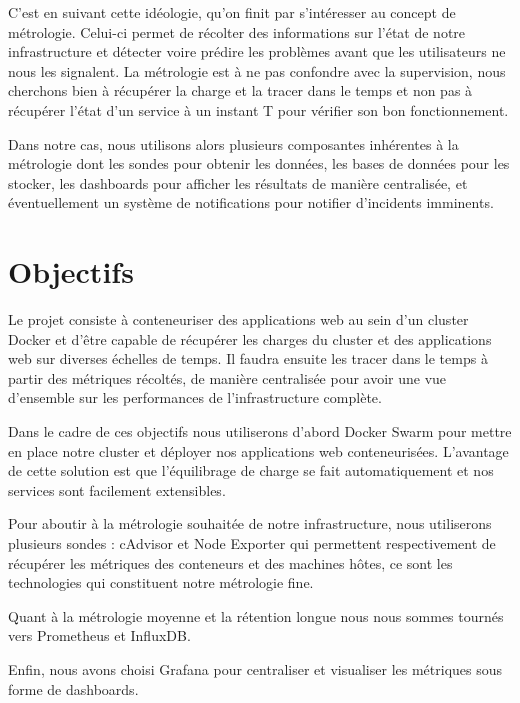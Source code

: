 \documentclass[oneside,12pt]{report}
\begin{document}
C'est en suivant cette idéologie, qu'on finit par s'intéresser au concept de métrologie. Celui-ci permet de récolter des informations sur l'état de notre infrastructure et détecter voire prédire les problèmes avant que les utilisateurs ne nous les signalent. La métrologie est à ne pas confondre avec la supervision, nous cherchons bien à récupérer la charge et la tracer dans le temps et non pas à récupérer l'état d'un service à un instant T pour vérifier son bon fonctionnement. \newline

Dans notre cas, nous utilisons alors plusieurs composantes inhérentes à la métrologie dont les sondes pour obtenir les données, les bases de données pour les stocker, les dashboards pour afficher les résultats de manière centralisée, et éventuellement un système de notifications pour notifier d'incidents imminents.

\section{Objectifs}

Le projet consiste à conteneuriser des applications web au sein d'un cluster Docker et d'être capable de récupérer les charges du cluster et des applications web sur diverses échelles de temps. Il faudra ensuite les tracer dans le temps à partir des métriques récoltés, de manière centralisée pour avoir une vue d'ensemble sur les performances de l'infrastructure complète. \newline


Dans le cadre de ces objectifs nous utiliserons d'abord Docker Swarm pour mettre en place notre cluster et déployer nos applications web conteneurisées. L'avantage de cette solution est que l'équilibrage de charge se fait automatiquement et nos services sont facilement extensibles.\newline


Pour aboutir à la métrologie souhaitée de notre infrastructure, nous utiliserons plusieurs sondes : cAdvisor et Node Exporter qui permettent respectivement de récupérer les métriques des conteneurs et des machines hôtes, ce sont les technologies qui constituent notre métrologie fine.\newline


Quant à la métrologie moyenne et la rétention longue nous nous sommes tournés vers Prometheus et InfluxDB.\newline

Enfin, nous avons choisi Grafana pour centraliser et visualiser les métriques sous forme de dashboards.\newline
\end{document}
